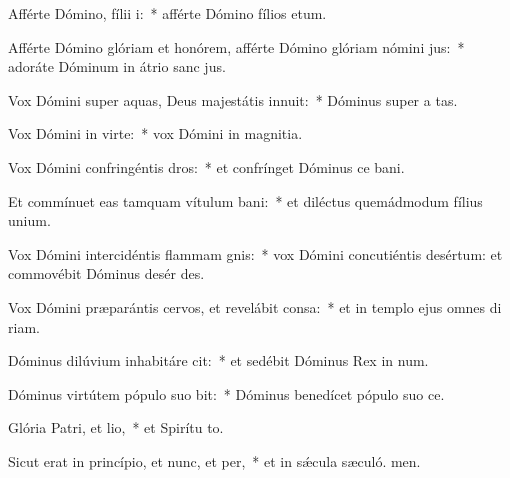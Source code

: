 \item Afférte Dómino, fílii i:~* afférte Dómino fílios etum.
\item Afférte Dómino glóriam et honórem, afférte Dómino glóriam nómini jus:~* adoráte Dóminum in átrio sanc jus.
\item Vox Dómini super aquas, Deus majestátis innuit:~* Dóminus super a tas.
\item Vox Dómini in virte:~* vox Dómini in magnitia.
\item Vox Dómini confringéntis dros:~* et confrínget Dóminus ce bani.
\item Et commínuet eas tamquam vítulum bani:~* et diléctus quemádmodum fílius unium.
\item Vox Dómini intercidéntis flammam gnis:~* vox Dómini concutiéntis desértum: et commovébit Dóminus desér des.
\item Vox Dómini præparántis cervos, et revelábit consa:~* et in templo ejus omnes di riam.
\item Dóminus dilúvium inhabitáre cit:~* et sedébit Dóminus Rex in num.
\item Dóminus virtútem pópulo suo bit:~* Dóminus benedícet pópulo suo  ce.
\item Glória Patri, et lio,~* et Spirítu to.
\item Sicut erat in princípio, et nunc, et per,~* et in sǽcula sæculó. men.
